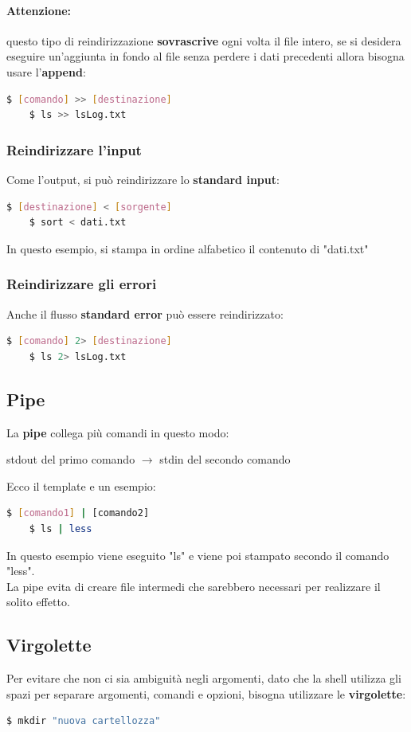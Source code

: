 \documentclass[12pt,a4paper]{article}
\begin{document}
\paragraph{Attenzione:} questo tipo di reindirizzazione \textbf{sovrascrive} ogni volta il file intero, se si desidera eseguire un'aggiunta in fondo al file senza perdere i dati precedenti allora bisogna usare l'\textbf{append}:
\begin{lstlisting}[language=bash]
    $ [comando] >> [destinazione]
    $ ls >> lsLog.txt
\end{lstlisting}
\subsubsection{Reindirizzare l'input}
Come l'output, si può reindirizzare lo \textbf{standard input}:
\begin{lstlisting}[language=bash]
    $ [destinazione] < [sorgente]
    $ sort < dati.txt
\end{lstlisting}
In questo esempio, si stampa in ordine alfabetico il contenuto di "dati.txt"
\subsubsection{Reindirizzare gli errori}
Anche il flusso \textbf{standard error} può essere reindirizzato:
\begin{lstlisting}[language=bash]
    $ [comando] 2> [destinazione]
    $ ls 2> lsLog.txt
\end{lstlisting}
\subsection{Pipe}
La \textbf{pipe} collega più comandi in questo modo:
\begin{center}
    stdout del primo comando $\rightarrow$ stdin del secondo comando
\end{center}
Ecco il template e un esempio:
\begin{lstlisting}[language=bash]
    $ [comando1] | [comando2]
    $ ls | less
\end{lstlisting}
In questo esempio viene eseguito "ls" e viene poi stampato secondo il comando "less".\\
La pipe evita di creare file intermedi che sarebbero necessari per realizzare il solito effetto.
\subsection{Virgolette}
Per evitare che non ci sia ambiguità negli argomenti, dato che la shell utilizza gli spazi per separare argomenti, comandi e opzioni, bisogna utilizzare le \textbf{virgolette}:
\begin{lstlisting}[language=bash]
    $ mkdir "nuova cartellozza"
\end{lstlisting}
\end{document}

